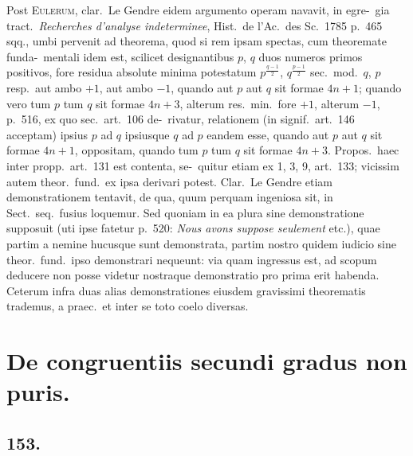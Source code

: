 \documentclass[12pt,a4paper]{article}
\theoremstyle{plain}
\theoremstyle{definition}
\theoremstyle{remark}
\begin{document}
Post \textsc{Eulerum}, clar.\ Le Gendre eidem argumento operam navavit, in egre-\ gia tract.\ \emph{Recherches d'analyse indeterminee}, Hist.\ de l'Ac.\ des Sc.\ 1785 p.~465 sqq.,
umbi pervenit ad theorema, quod si rem ipsam spectas, cum theoremate funda-\ mentali idem est, scilicet designantibus $p$, $q$ duos numeros primos positivos, fore residua absolute
minima potestatum $p^{\frac{q-1}{2}}$, $q^{\frac{p-1}{2}}$ sec.\ mod.\ $q$, $p$ resp.\ aut ambo $+1$, aut ambo $-1$,
quando aut $p$ aut $q$ sit formae $4n+1$; quando vero tum $p$ tum $q$ sit formae
$4n+3$, alterum res.\ min.\ fore $+1$, alterum $-1$, p.~516, ex quo sec.\ art.~106 de-\ rivatur, relationem (in signif.\ art.~146 acceptam) ipsius $p$ ad $q$ ipsiusque $q$ ad $p$
eandem esse, quando aut $p$ aut $q$ sit formae $4n+1$, oppositam, quando tum $p$
tum $q$ sit formae $4n+3$. Propos.\ haec inter propp.\ art.~131 est contenta, se-\ quitur etiam ex 1, 3, 9, art.~133; vicissim autem theor.\ fund.\ ex ipsa derivari
potest. Clar.\ Le Gendre etiam demonstrationem tentavit, de qua, quum perquam
ingeniosa sit, in Sect.\ seq.\ fusius loquemur. Sed quoniam in ea plura sine
demonstratione supposuit (uti ipse fatetur p.~520: \foreignlanguage{french}{\emph{Nous avons suppose seulement}} etc.),
quae partim a nemine hucusque sunt demonstrata, partim nostro quidem iudicio
sine theor.\ fund.\ ipso demonstrari nequeunt: via quam ingressus est, ad scopum
deducere non posse videtur nostraque demonstratio pro prima erit habenda.
Ceterum infra duas alias demonstrationes eiusdem gravissimi theorematis trademus,
a praec.\ et inter se toto coelo diversas.

\section*{De congruentiis secundi gradus non puris.}

\subsection*{153.}
\end{document}
